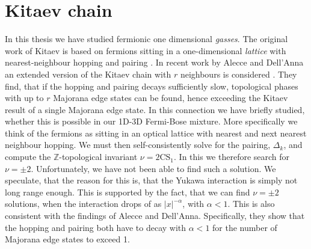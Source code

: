 \section{Kitaev chain} \label{sec.Discussion.KitaevChain}
In this thesis we have studied fermionic one dimensional \textit{gasses}. The original work of Kitaev is based on fermions sitting in a one-dimensional \textit{lattice} with nearest-neighbour hopping and pairing \cite{KitaevQuantumWires}. In recent work by Alecce and Dell'Anna an extended version of the Kitaev chain with $r$ neighbours is considered \cite{Alecce.extendKitaev}. They find, that if the hopping and pairing decays sufficiently slow, topological phases with up to $r$ Majorana edge states can be found, hence exceeding the Kitaev result of a single Majorana edge state. In this connection we have briefly studied, whether this is possible in our 1D-3D Fermi-Bose mixture. More specifically we think of the fermions as sitting in an optical lattice with nearest and next nearest neighbour hopping. We must then self-consistently solve for the pairing, $\Delta_k$, and compute the $\mathbb{Z}$-topological invariant $\nu = 2\text{CS}_1$. In this we therefore search for $\nu = \pm 2$. Unfortunately, we have not been able to find such a solution. We speculate, that the reason for this is, that the Yukawa interaction is simply not long range enough. This is supported by the fact, that we can find $\nu = \pm 2$ solutions, when the interaction drops of as $|x|^{-\alpha}$, with $\alpha < 1$. This is also consistent with the findings of Alecce and Dell'Anna. Specifically, they show that the hopping and pairing both have to decay with $\alpha < 1$ for the number of Majorana edge states to exceed 1. 


